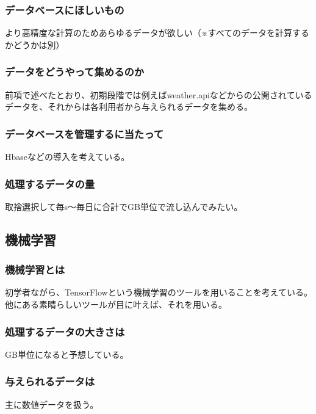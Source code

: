 \documentclass{scrartcl}
\begin{document}
\subsubsection{データベースにほしいもの}
\label{sec:orgd60b96d}
より高精度な計算のためあらゆるデータが欲しい（※すべてのデータを計算するかどうかは別）\\
\subsubsection{データをどうやって集めるのか}
\label{sec:org381e7e9}
前項で述べたとおり、初期段階では例えばweather.apiなどからの公開されているデータを、それからは各利用者から与えられるデータを集める。\\
\subsubsection{データベースを管理するに当たって}
\label{sec:org2ed1c7c}
Hbaseなどの導入を考えている。\\
\subsubsection{処理するデータの量}
\label{sec:org33d70e9}
取捨選択して毎s〜毎日に合計でGB単位で流し込んでみたい。\\
\subsection{機械学習}
\label{sec:org9d2a476}
\subsubsection{機械学習とは}
\label{sec:orgdf42cfe}
初学者ながら、TensorFlowという機械学習のツールを用いることを考えている。他にある素晴らしいツールが目に叶えば、それを用いる。\\
\subsubsection{処理するデータの大きさは}
\label{sec:org3b7cb86}
GB単位になると予想している。\\
\subsubsection{与えられるデータは}
\label{sec:orgee9988c}
主に数値データを扱う。\\
\end{document}
